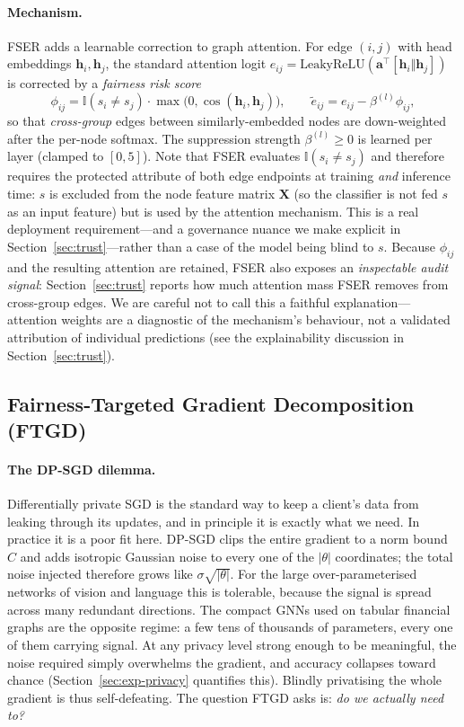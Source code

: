 \documentclass[pdflatex,sn-mathphys-num]{sn-jnl}
\theoremstyle{thmstyleone}%
\theoremstyle{thmstyletwo}%
\theoremstyle{thmstylethree}%
\begin{document}
\paragraph{Mechanism.}
FSER adds a learnable correction to graph attention. For edge $(i,j)$ with head
embeddings
$\mathbf{h}_i,\mathbf{h}_j$, the standard attention logit
$e_{ij}=\mathrm{LeakyReLU}(\mathbf{a}^\top[\mathbf{h}_i\Vert\mathbf{h}_j])$ is
corrected by a \emph{fairness risk score}
\begin{equation}
\phi_{ij}=\mathbb{I}(s_i\neq s_j)\cdot\max\!\big(0,\cos(\mathbf{h}_i,\mathbf{h}_j)\big),
\qquad
\tilde{e}_{ij}=e_{ij}-\beta^{(l)}\phi_{ij},
\label{eq:fser}
\end{equation}
so that \emph{cross-group} edges between similarly-embedded nodes are
down-weighted after the per-node softmax. The suppression strength
$\beta^{(l)}\!\ge\!0$ is learned per layer (clamped to $[0,5]$). Note that FSER
evaluates $\mathbb{I}(s_i\neq s_j)$ and therefore requires the protected
attribute of both edge endpoints at training \emph{and} inference time: $s$ is
excluded from the node feature matrix $\mathbf{X}$ (so the classifier is not fed
$s$ as an input feature) but is used by the attention mechanism. This is a real
deployment requirement---and a governance nuance we make explicit in
Section~\ref{sec:trust}---rather than a case of the model being blind to $s$.
Because $\phi_{ij}$ and the resulting attention are retained, FSER also exposes
an \emph{inspectable audit signal}: Section~\ref{sec:trust} reports how much
attention mass FSER removes from cross-group edges. We are careful not to call
this a faithful explanation---attention weights are a diagnostic of the
mechanism's behaviour, not a validated attribution of individual predictions
(see the explainability discussion in Section~\ref{sec:trust}).

\subsection{Fairness-Targeted Gradient Decomposition (FTGD)}
\label{sec:ftgd}

\paragraph{The DP-SGD dilemma.}
Differentially private SGD is the standard way to keep a client's data from
leaking through its updates, and in principle it is exactly what we need. In
practice it is a poor fit here. DP-SGD clips the entire gradient to a norm bound
$C$ and adds isotropic Gaussian noise to every one of the $|\theta|$
coordinates; the total noise injected therefore grows like $\sigma\sqrt{|\theta|}$.
For the large over-parameterised networks of vision and language this is
tolerable, because the signal is spread across many redundant directions. The
compact GNNs used on tabular financial graphs are the opposite regime: a few
tens of thousands of parameters, every one of them carrying signal. At any
privacy level strong enough to be meaningful, the noise required simply
overwhelms the gradient, and accuracy collapses toward chance
(Section~\ref{sec:exp-privacy} quantifies this). Blindly privatising the whole
gradient is thus self-defeating. The question FTGD asks is: \emph{do we actually
need to?}
\end{document}
